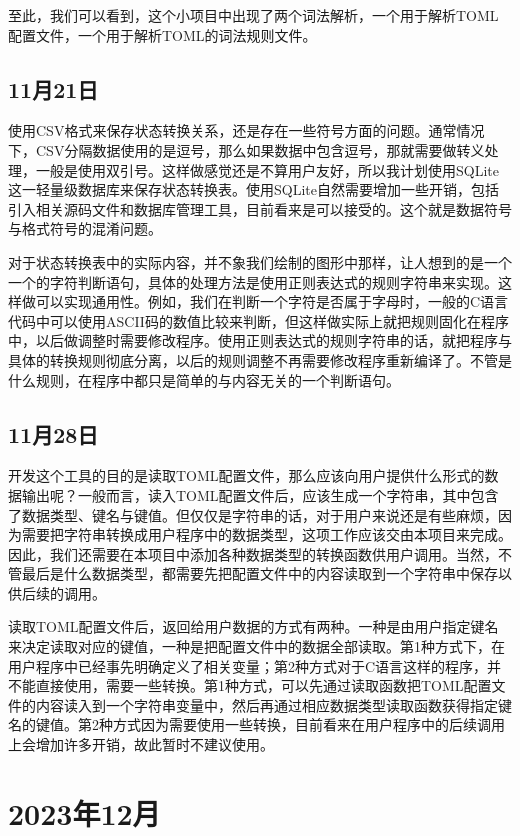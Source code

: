 至此，我们可以看到，这个小项目中出现了两个词法解析，一个用于解析TOML配置文件，一个用于解析TOML的词法规则文件。


\subsection{11月21日}
使用CSV格式来保存状态转换关系，还是存在一些符号方面的问题。通常情况下，CSV分隔数据使用的是逗号，那么如果数据中包含逗号，那就需要做转义处理，一般是使用双引号。这样做感觉还是不算用户友好，所以我计划使用SQLite这一轻量级数据库来保存状态转换表。使用SQLite自然需要增加一些开销，包括引入相关源码文件和数据库管理工具，目前看来是可以接受的。这个就是数据符号与格式符号的混淆问题。

对于状态转换表中的实际内容，并不象我们绘制的图形中那样，让人想到的是一个一个的字符判断语句，具体的处理方法是使用正则表达式的规则字符串来实现。这样做可以实现通用性。例如，我们在判断一个字符是否属于字母时，一般的C语言代码中可以使用ASCII码的数值比较来判断，但这样做实际上就把规则固化在程序中，以后做调整时需要修改程序。使用正则表达式的规则字符串的话，就把程序与具体的转换规则彻底分离，以后的规则调整不再需要修改程序重新编译了。不管是什么规则，在程序中都只是简单的与内容无关的一个判断语句。


\subsection{11月28日}
开发这个工具的目的是读取TOML配置文件，那么应该向用户提供什么形式的数据输出呢？一般而言，读入TOML配置文件后，应该生成一个字符串，其中包含了数据类型、键名与键值。但仅仅是字符串的话，对于用户来说还是有些麻烦，因为需要把字符串转换成用户程序中的数据类型，这项工作应该交由本项目来完成。因此，我们还需要在本项目中添加各种数据类型的转换函数供用户调用。当然，不管最后是什么数据类型，都需要先把配置文件中的内容读取到一个字符串中保存以供后续的调用。

读取TOML配置文件后，返回给用户数据的方式有两种。一种是由用户指定键名来决定读取对应的键值，一种是把配置文件中的数据全部读取。第1种方式下，在用户程序中已经事先明确定义了相关变量；第2种方式对于C语言这样的程序，并不能直接使用，需要一些转换。第1种方式，可以先通过读取函数把TOML配置文件的内容读入到一个字符串变量中，然后再通过相应数据类型读取函数获得指定键名的键值。第2种方式因为需要使用一些转换，目前看来在用户程序中的后续调用上会增加许多开销，故此暂时不建议使用。


\section{2023年12月}


